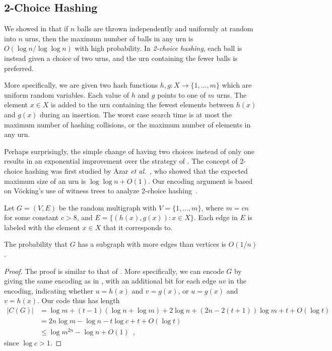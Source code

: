 \documentclass{patmorin}
\newcommand{\aremark}[3]{\textcolor{blue}{\textsc{#1 #2:}}
  \textcolor{red}{\textsf{#3}}}
\newcommand{\wolfgang}[2][says]{\aremark{Wolfgang}{#1}{#2}}
\begin{document}
\subsection{2-Choice Hashing}

We showed in  that if $n$ balls are thrown independently
and uniformly at random into $n$ urns, then the maximum number of
balls in any urn is $O(\log n/\log \log n)$ with high probability. In
\emph{2-choice hashing}, each ball is instead given a choice of two
urns, and the urn containing the fewer balls is preferred.

More specifically, we are given two hash functions $h, g : X \to \{1,
\ldots, m\}$ which are uniform random variables. Each value of $h$ and
$g$ points to one of $m$ urns. The element $x \in X$ is added to the
urn containing the fewest elements between $h(x)$ and $g(x)$ during an
insertion. The worst case search time is at most the maximum number of
hashing collisions, or the maximum number of elements in any urn.

Perhaps surprisingly, the simple change of having two choices instead
of only one results in an exponential improvement over the strategy of
. The concept of 2-choice hashing was first studied by 
Azar \emph{et
  al.}~\cite{azar:multiplechoice}, who showed that the expected
maximum size of an urn is $\log \log n + O(1)$. Our encoding argument
is based on V\"{o}cking's use of witness trees to analyze 2-choice
hashing~\cite{vocking:witness}.

Let $G = (V, E)$ be the random multigraph with $V = \{1, \ldots, m\}$,
where $m = cn$ for some constant $c > 8$, and
$E = \{(h(x), g(x)) : x \in X\}$. Each edge in $E$ is
labeled with the element $x \in X$ that it corresponds to.

\begin{lem}
  The probability that $G$ has a subgraph with more edges than 
  vertices is
  $O(1/n)$.
\end{lem}
\begin{proof}
  The proof is similar to that of . More
  specifically, we can encode $G$ by giving the same encoding as in
  , with an additional bit for each edge $uv$
  in the encoding, indicating whether $u = h(x)$ and $v = g(x)$, or $u
  = g(x)$ and $v = h(x)$. Our code thus has length
  \begin{align*}
    |C(G)| &= \log m + (t - 1)(\log n + \log m) + 2 \log n + (2n - 2(t + 1))\log m + t + O(\log t) \\
           &= 2n \log m - \log n - t \log c + t + O(\log t) \\
           &\le \log m^{2n} - \log n + O(1) \enspace ,
  \end{align*}
  since $\log c > 1$.
\end{proof}
\end{document}
